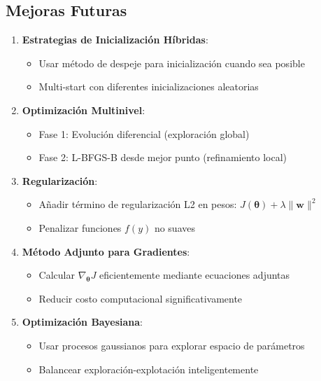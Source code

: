 \documentclass[11pt,a4paper]{article}
\begin{document}
\subsection{Mejoras Futuras}

\begin{enumerate}
    \item \textbf{Estrategias de Inicialización Híbridas}:
    \begin{itemize}
        \item Usar método de despeje para inicialización cuando sea posible
        \item Multi-start con diferentes inicializaciones aleatorias
    \end{itemize}

    \item \textbf{Optimización Multinivel}:
    \begin{itemize}
        \item Fase 1: Evolución diferencial (exploración global)
        \item Fase 2: L-BFGS-B desde mejor punto (refinamiento local)
    \end{itemize}

    \item \textbf{Regularización}:
    \begin{itemize}
        \item Añadir término de regularización L2 en pesos: $J(\boldsymbol{\theta}) + \lambda \|\mathbf{w}\|^2$
        \item Penalizar funciones $f(y)$ no suaves
    \end{itemize}

    \item \textbf{Método Adjunto para Gradientes}:
    \begin{itemize}
        \item Calcular $\nabla_{\boldsymbol{\theta}} J$ eficientemente mediante ecuaciones adjuntas
        \item Reducir costo computacional significativamente
    \end{itemize}

    \item \textbf{Optimización Bayesiana}:
    \begin{itemize}
        \item Usar procesos gaussianos para explorar espacio de parámetros
        \item Balancear exploración-explotación inteligentemente
    \end{itemize}
\end{enumerate}
\end{document}
